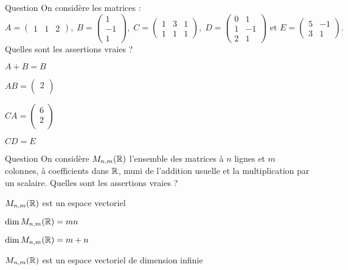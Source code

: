 \begin{multi}[multiple,feedback=
{Les opérations \(A+B\) et \(CA\) ne sont pas définies.
}]{Question}
On considère les matrices : 
\[A=\left(\begin{array}{rcc}
1&1&2\end{array}\right),\; B=  
\left(\begin{array}{rc}1\\-1\\ 1
\end{array}\right),\; C=  
\left(\begin{array}{rcc}
1&3&1\\ 1&1&1
\end{array}\right),\; D= \left(\begin{array}{rc}
0&1\\ 1&-1\\ 2&1 \end{array}\right)\mbox{ et }E=\left(\begin{array}{rc}5&-1\\3&1\end{array}\right).\]
Quelles sont les assertions vraies ?

    \item \(A+B=B\)
    \item* \(AB=\left(\begin{array}{rc}2\\ \end{array}\right)\)
    \item \(CA=\left(\begin{array}{rc}6\\ 2\\\end{array}\right)\)
    \item* \(CD=E\)
\end{multi}


\begin{multi}[multiple,feedback=
{On vérifie que \(M_{n,m} (\Rr)\), muni des opérations usuelles est un \(\Rr\)- espace vectoriel.
\vskip0mm
Pour \(1\le i\le n\) et \(1\le j\le m\), on note \(D_{i,j}\) la matrice dont le coefficient située à la ième ligne et jième colonne est \(1\) et les autres coefficients sont nuls. Alors, \(\{D_{i,j}\; ; \; 1\le i\le n, 1\le j\le m\}\) est une base de \(M_{n,m} (\Rr)\). Par conséquent, \(\dim M_{n,m} (\Rr) = mn \).
}]{Question}
On considère \(M_{n,m} (\Rr)\) l'ensemble des matrices à \(n\) lignes et \(m\) colonnes, à  coefficients dans \(\Rr\), muni de l'addition usuelle et la multiplication par un scalaire. Quelles sont les assertions vraies ?

    \item* \(M_{n,m} (\Rr)\) est un espace vectoriel
    \item* \(\dim M_{n,m} (\Rr) = mn \)
    \item \(\dim M_{n,m} (\mathbb{R}) = m+n \)
    \item \(M_{n,m} (\Rr)\) est un espace vectoriel de dimension infinie
\end{multi}



